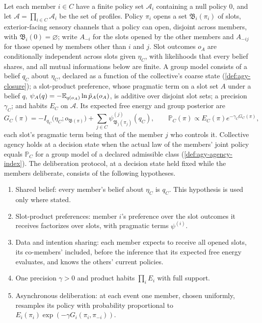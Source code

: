 \begin{definition}\label{def:agy-group-model}
Let each member $i\in C$ have a finite policy set $\mathcal A_i$ containing a null policy $0$, and let $\mathcal A=\prod_{i\in C}\mathcal A_i$ be the set of profiles. Policy $\pi_i$ opens a set $\mathfrak B_i(\pi_i)$ of slots, exterior-facing sensory channels that a policy can open, disjoint across members, with $\mathfrak B_i(0)=\varnothing$; write $A_{-i}$ for the slots opened by the other members and $A_{-ij}$ for those opened by members other than $i$ and $j$. Slot outcomes $o_A$ are conditionally independent across slots given $\eta_C$, with likelihoods that every belief shares, and all mutual informations below are finite. A group model consists of a belief $q_C$ about $\eta_C$, declared as a function of the collective's coarse state (\cref{def:agy-closure}); a slot-product preference, whose pragmatic term on a slot set $A$ under a belief $q$, $\psi_A(q)=-\mathbb{E}_{q(o_A)}\ln\tilde p_A(o_A)$, is additive over disjoint slot sets; a precision $\gamma_C$; and habits $E_C$ on $\mathcal A$. Its expected free energy and group posterior are
\begin{equation}\label{eq:agy-group-efe}
G_C(\pi)=-I_{q_C}\bigl(\eta_C;o_{\mathfrak B(\pi)}\bigr)+\sum_{j\in C}\psi^{(j)}_{\mathfrak B_j(\pi_j)}(q_C),\qquad\mathbb P_C(\pi)\propto E_C(\pi)e^{-\gamma_CG_C(\pi)},
\end{equation}
each slot's pragmatic term being that of the member $j$ who controls it. Collective agency holds at a decision state when the actual law of the members' joint policy equals $\mathbb P_C$ for a group model of a declared admissible class (\cref{def:agy-agency-index}). The deliberation protocol, at a decision state held fixed while the members deliberate, consists of the following hypotheses.
\begin{enumerate}
\item[(P0)] Shared belief: every member's belief about $\eta_C$ is $q_C$. This hypothesis is used only where stated.
\item[(P1)] Slot-product preferences: member $i$'s preference over the slot outcomes it receives factorizes over slots, with pragmatic terms $\psi^{(i)}$.
\item[(P2)] Data and intention sharing: each member expects to receive all opened slots, its co-members' included, before the inference that its expected free energy evaluates, and knows the others' current policies.
\item[(P3)] One precision $\gamma>0$ and product habits $\prod_iE_i$ with full support.
\item[(P4)] Asynchronous deliberation: at each event one member, chosen uniformly, resamples its policy with probability proportional to $E_i(\pi_i)\exp(-\gamma G_i(\pi_i,\pi_{-i}))$.
\end{enumerate}
\end{definition}

